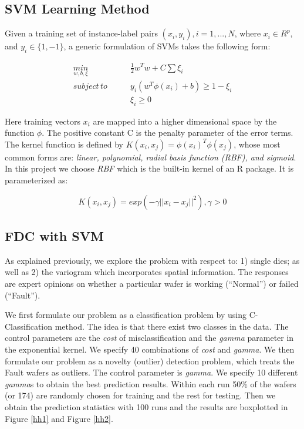 \documentclass[english]{article}
\numberwithin{equation}{section}
\numberwithin{table}{section}
\numberwithin{figure}{section}
\begin{document}
\subsection{SVM Learning Method}
\hspace{12 pt}
Given a training set of instance-label pairs $(x_{i},y_{i}),i=1,...,N$,
where $x_{i}\in R^{p}$, and $y_{i}\in\{1,-1\}$, a generic formulation
of SVMs takes the following form:

\begin{equation} \label{hheq1}
\begin{split}
\underset{w,b,\xi}{min} \qquad &\frac{1}{2}w^{T}w+C\sum\xi_{i} \\
subject\, to \qquad &y_{i}(w^{T}\phi(x_{i})+b)\geqslant1-\xi_{i} \\
&\xi_{i}\geqslant0
\end{split}
\end{equation}


Here training vectors $x_{i}$ are mapped into a higher dimensional
space by the function $\phi$. The positive constant C is the penalty
parameter of the error terms. The kernel function is defined by $K(x_{i},x_{j})=\phi(x_{i})^{T}\phi(x_{j})$,
whose most common forms are: \emph{linear, polynomial, radial basis
function (RBF), and sigmoid}. In this project we choose \emph{RBF}
which is the built-in kernel of an R package. It is parameterized
as:

\begin{equation} \label{hheq2}
K(x_{i},x_{j})=exp(-\gamma||x_{i}-x_{j}||^{2}),\gamma>0
\end{equation}


\subsection{FDC with SVM}
\hspace{12 pt}
As explained previously, we explore the problem with respect to: 1)
single dies; as well as 2) the variogram which incorporates spatial
information. The responses are expert opinions on whether a particular
wafer is working (``Normal'') or failed (``Fault'').


We first formulate our problem as a classification problem by using
C-Classification method. The idea is that there exist two classes
in the data. The control parameters are the \emph{cost} of misclassification
and the \emph{gamma} parameter in the exponential kernel. We specify
40 combinations of \emph{cost} and \emph{gamma}. We then formulate
our problem as a novelty (outlier) detection problem, which treats
the Fault wafers as outliers. The control parameter is \emph{gamma}.
We specify 10 different \emph{gamma}s to obtain the best prediction
results. Within each run 50\% of the wafers (or 174) are randomly
chosen for training and the rest for testing. Then we obtain the prediction
statistics with 100 runs and the results are boxplotted in Figure
\ref{hh1} and Figure \ref{hh2}.
\end{document}
